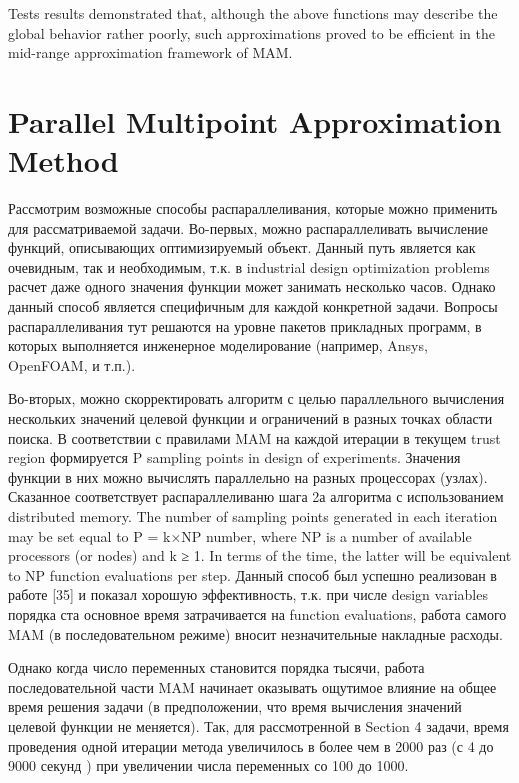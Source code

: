 \documentclass[runningheads,a4paper]{llncs}
\begin{document}
Tests results demonstrated that, although the above functions may describe the global behavior rather poorly, such approximations proved to be efficient in the mid-range approximation framework of MAM.

\section{Parallel Multipoint Approximation Method}\label{sec:par_alg}

\Russian
Рассмотрим возможные способы распараллеливания, которые можно применить для рассматриваемой задачи.
Во-первых, можно распараллеливать вычисление функций, описывающих оптимизируемый объект. Данный путь является как очевидным, так и необходимым, т.к. в industrial design optimization problems расчет даже одного значения функции может занимать несколько часов. Однако данный способ является специфичным для каждой конкретной задачи. Вопросы распараллеливания тут решаются на уровне пакетов прикладных программ, в которых выполняется инженерное моделирование (например, Ansys, OpenFOAM, и т.п.). 

Во-вторых, можно скорректировать алгоритм с целью параллельного вычисления нескольких значений целевой функции и ограничений в разных точках области поиска. В соответствии с правилами MAM на каждой итерации в текущем trust region формируется P sampling points in design of experiments. Значения функции в них можно вычислять параллельно на разных процессорах (узлах). Сказанное соответствует распараллеливаню шага 2а алгоритма с использованием distributed memory. The number of sampling points generated in each iteration may be set equal to P = k×NP number, where NP is a number of available processors (or nodes) and k ≥ 1. In terms of the time, the latter will be equivalent to NP function evaluations per step. Данный способ был успешно реализован в работе [35] и показал хорошую эффективность, т.к. при числе design variables порядка ста основное время затрачивается на function evaluations, работа самого MAM (в последовательном режиме) вносит незначительные накладные расходы.

Однако когда число переменных становится порядка тысячи, работа последовательной части MAM начинает оказывать ощутимое влияние на общее время решения задачи (в предположении, что время вычисления значений целевой функции не меняется). Так, для рассмотренной в Section 4 задачи, время проведения одной итерации метода увеличилось в более чем в 2000 раз (с 4 до 9000 секунд ) при увеличении числа переменных со 100 до 1000. 
\end{document}
